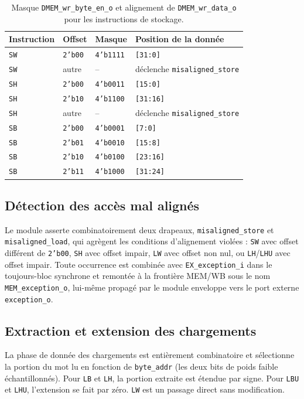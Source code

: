 \documentclass[11pt,a4paper,oneside]{report}
\begin{document}
\begin{table}[h]
\caption{Masque \texttt{DMEM\_wr\_byte\_en\_o} et alignement de
\texttt{DMEM\_wr\_data\_o} pour les instructions de stockage.}
\label{tab:byteen}
\centering
\begin{tabular}{@{}llll@{}}
\toprule
Instruction & Offset & Masque & Position de la donnée \\
\midrule
\texttt{SW} & \texttt{2'b00}   & \texttt{4'b1111} & \texttt{[31:0]} \\
\texttt{SW} & autre            &  --  & déclenche \texttt{misaligned\_store} \\
\texttt{SH} & \texttt{2'b00}   & \texttt{4'b0011} & \texttt{[15:0]} \\
\texttt{SH} & \texttt{2'b10}   & \texttt{4'b1100} & \texttt{[31:16]} \\
\texttt{SH} & autre            &  --  & déclenche \texttt{misaligned\_store} \\
\texttt{SB} & \texttt{2'b00}   & \texttt{4'b0001} & \texttt{[7:0]} \\
\texttt{SB} & \texttt{2'b01}   & \texttt{4'b0010} & \texttt{[15:8]} \\
\texttt{SB} & \texttt{2'b10}   & \texttt{4'b0100} & \texttt{[23:16]} \\
\texttt{SB} & \texttt{2'b11}   & \texttt{4'b1000} & \texttt{[31:24]} \\
\bottomrule
\end{tabular}
\end{table}

\subsection{Détection des accès mal alignés}
Le module asserte combinatoirement deux drapeaux,
\texttt{misaligned\_store} et \texttt{misaligned\_load}, qui
agrègent les conditions d'alignement violées : \texttt{SW} avec
offset différent de \texttt{2'b00}, \texttt{SH} avec offset impair,
\texttt{LW} avec offset non nul, ou \texttt{LH}/\texttt{LHU} avec
offset impair. Toute occurrence est combinée avec
\texttt{EX\_exception\_i} dans le toujours-bloc synchrone et
remontée à la frontière MEM/WB sous le nom
\texttt{MEM\_exception\_o}, lui-même propagé par le module
enveloppe vers le port externe \texttt{exception\_o}.

\subsection{Extraction et extension des chargements}
La phase de donnée des chargements est entièrement combinatoire et
sélectionne la portion du mot lu en fonction de
\texttt{byte\_addr} (les deux bits de poids faible
échantillonnés). Pour \texttt{LB} et \texttt{LH}, la portion
extraite est étendue par signe. Pour \texttt{LBU} et
\texttt{LHU}, l'extension se fait par zéro. \texttt{LW} est un
passage direct sans modification.
\end{document}
